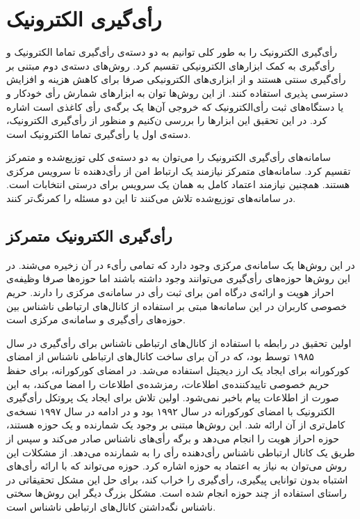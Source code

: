 \section{رأی‌گیری الکترونیک}
رأی‌گیری الکترونیک را به طور کلی ‌‌توانیم به دو دسته‌ی رأی‌گیری تماما الکترونیک و رأی‌گیری به کمک ابزار‌های الکترونیکی تقسیم کرد. روش‌های دسته‌ی دوم مبتنی بر رأی‌گیری سنتی هستند و از ابزاری‌های الکترونیکی صرفا برای کاهش هزینه و افزایش دسترسی پذیری استفاده ‌‌کنند. از این روش‌ها ‌‌توان به ابزارهای شمارش رأی خودکار و یا دستگاه‌های ثبت رأی‌الکترونیک که خروجی آن‌ها یک برگه‌ی رأی‌ کاغذی
است اشاره کرد. در این تحقیق این ابزارها را بررسی ن‌‌کنیم و منظور از رأی‌گیری الکترونیک، دسته‌ی اول یا رأی‌گیری تماما الکترونیک است.
\par
سامانه‌های رأی‌گیری الکترونیک را می‌توان به دو د‌سته‌ی کلی توزیع‌شده و متمرکز تقسیم کرد. سامانه‌های متمرکز نیازمند یک ارتباط امن از رأی‌دهنده تا سرویس مرکزی هستند. همچنین نیازمند اعتماد کامل به همان یک سرویس برای درستی انتخابات است. در سامانه‌های توزیع‌شده تلاش می‌کنند تا این دو مسئله را کمرنگ‌تر کنند.

\subsection{رأی‌گیری الکترونیک متمرکز}
در این روش‌ها یک سامانه‌ی مرکزی وجود دارد که تمامی رأیء در آن زخیره می‌شند. در این روش‌ها حوزه‌های رأی‌گیری می‌توانند وجود داشته باشند اما حوزه‌ها صرفا وظیفه‌ی احراز هویت و ارائه‌ی درگاه امن برای ثبت رأی در سامانه‌ی مرکزی را دارند. حریم خصوصی کاربران در این سامانه‌ها مبتی بر استفاده از کانال‌های ارتباطی ناشناس 
بین حوزه‌های رأی‌گیری و سامانه‌ی مرکزی است.
\par
اولین تحقیق در رابطه با استفاده‌ از کانال‌های ارتباطی ناشناس برای رأی‌گیری در سال ۱۹۸۵ توسط 
\cite{Chaum}
بود، که در آن برای ساخت‌ کانال‌های ارتباطی ناشناس از امضای کورکورانه 
\cite{blindsig}
برای ایجاد یک ارز دیجیتل استفاده می‌شد. در امضای کورکورانه، برای حفظ حریم خصوصی تاییدکننده‌ی اطلاعات، رمزشده‌ی اطلاعات را امضا می‌کند، به این صورت از اطلاعات پیام باخبر نمی‌شود. اولین تلاش برای ایجاد یک پروتکل رأی‌گیری الکترونیک با امضای کورکورانه در سال ۱۹۹۲ 
\cite{foo92}
بود و در ادامه در سال ۱۹۹۷
\cite{improveblind}
نسخه‌ی کامل‌تری از آن ارائه شد. این روش‌ها مبتنی بر وجود یک شمارنده و یک حوزه هستند، حوزه احراز هویت را انجام می‌دهد و برگه‌ رأی‌های ناشناس صادر می‌کند و سپس از طریق یک کانال ارتباطی ناشناس رأی‌دهنده رأی را به شمارنده می‌دهد. از مشکلات این روش می‌توان به نیاز به اعتماد به حوزه اشاره کرد. حوزه می‌تواند که با ارائه رأی‌های اشتباه بدون توانایی پیگیری، رأی‌گیری را خراب کند، برای حل این مشکل تحقیقاتی
\cite{multiteller}
در راستای استفاده از چند حوزه انجام شده است. مشکل بزرگ دیگر این روش‌ها
\cite{anonchan}
سختی ناشناس نگه‌داشتن کانال‌های ارتباطی ناشناس است.

